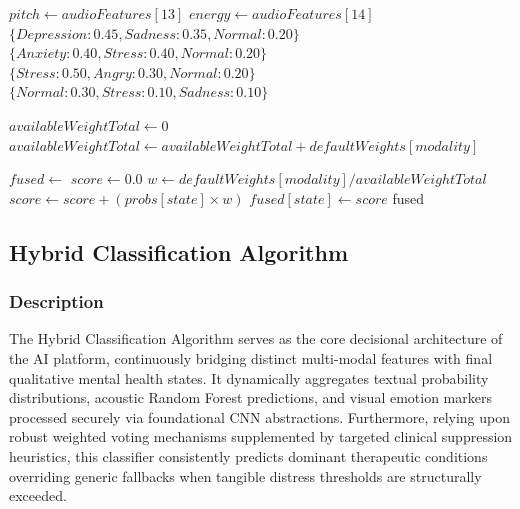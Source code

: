 \documentclass[11pt]{report}
\begin{document}
\begin{algorithm}[H]
\caption{Audio Prosody to Mental Health Mapping}
\label{alg:fusion_audio}
\begin{algorithmic}[1]
    \State $pitch \gets audioFeatures[13]$
    \State $energy \gets audioFeatures[14]$
        \State \Return $\{Depression: 0.45, Sadness: 0.35, Normal: 0.20\}$
        \State \Return $\{Anxiety: 0.40, Stress: 0.40, Normal: 0.20\}$
        \State \Return $\{Stress: 0.50, Angry: 0.30, Normal: 0.20\}$
    \Else
        \State \Return $\{Normal: 0.30, Stress: 0.10, Sadness: 0.10\}$
    \EndIf
\EndProcedure
\end{algorithmic}
\end{algorithm}

\begin{algorithm}[H]
\caption{Modality Weight Normalization}
\label{alg:fusion_weights}
\begin{algorithmic}[1]
    \State $availableWeightTotal \gets 0$
        \State $availableWeightTotal \gets availableWeightTotal + defaultWeights[modality]$
    \EndFor
    
    \State $fused \gets {}$
        \State $score \gets 0.0$
            \State $w \gets defaultWeights[modality] / availableWeightTotal$
            \State $score \gets score + (probs[state] \times w)$
        \EndFor
        \State $fused[state] \gets score$
    \EndFor
    \State \Return fused
\EndProcedure
\end{algorithmic}
\end{algorithm}

\subsection{Hybrid Classification Algorithm}

\subsubsection*{Description}
The Hybrid Classification Algorithm serves as the core decisional architecture of the AI platform, continuously bridging distinct multi-modal features with final qualitative mental health states. It dynamically aggregates textual probability distributions, acoustic Random Forest predictions, and visual emotion markers processed securely via foundational CNN abstractions. Furthermore, relying upon robust weighted voting mechanisms supplemented by targeted clinical suppression heuristics, this classifier consistently predicts dominant therapeutic conditions overriding generic fallbacks when tangible distress thresholds are structurally exceeded.
\end{document}

